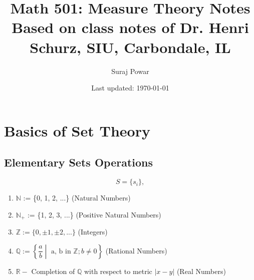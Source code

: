 \documentclass[letterpaper, 12pt]{article}
\newcommand{\1}{\mathds{1}}	%
\theoremstyle{definition}
\begin{document}

\title{Math 501: Measure Theory Notes \\[1em]
\normalsize Based on class notes of Dr. Henri Schurz, SIU, Carbondale, IL}


\author{\normalsize Suraj Powar}
\date{\normalsize\vspace{-1ex} Last updated: \today}


\maketitle
\tableofcontents\label{sec:contents}
\newpage
\section[Chapter 1: Basics of Set Theory]{Basics of Set Theory}

\subsection{Elementary Sets Operations}
\[S = \{s_i\}, \]

\begin{enumerate}
    \item $\mathbb{N}$ := \{0, 1, 2, ...\} \hspace*{\fill} (Natural Numbers) 
    \item $\mathbb{N_+}$ := \{1, 2, 3, ...\} \hspace*{\fill} (Positive Natural Numbers)
    \item $\mathbb{Z} := \{0, \pm{1}, \pm{2}, ...\}$ \hspace*{\fill} (Integers)
    \item $\mathbb{Q} := \left\{\dfrac{a}{b} \middle| \text{ a, b in } \mathbb{Z}; b \neq 0\right\}$ \hspace*{\fill} (Rational Numbers)
    \item $\mathbb{R} -$ Completion of $\mathbb{Q}$ with respect to metric $|x-y|$ \hspace*{\fill} (Real Numbers)
\end{enumerate}
\end{document}
